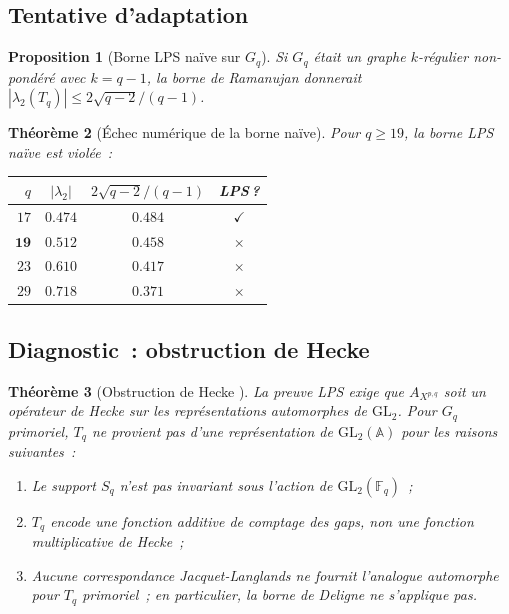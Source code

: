 \documentclass[11pt,a4paper]{article}
\newtheorem{theorem}{Théorème}[section]
\newtheorem{proposition}[theorem]{Proposition}
\theoremstyle{definition}
\newcommand{\F}{\mathbb{F}}
\newcommand{\bbA}{\mathbb{A}}
\newcommand{\GL}{\mathrm{GL}}
\begin{document}
\subsection{Tentative d'adaptation}

\begin{proposition}[Borne LPS naïve sur $G_q$]
\label{prop:lps_naive}
Si $G_q$ était un graphe $k$-régulier non-pondéré avec $k = q-1$,
la borne de Ramanujan donnerait $|\lambda_2(T_q)| \leq 2\sqrt{q-2}/(q-1)$.
\end{proposition}

\begin{theorem}[Échec numérique de la borne naïve]
\label{thm:lps_failure}
Pour $q\geq 19$, la borne LPS naïve est \emph{violée}~:
\begin{center}
\renewcommand{\arraystretch}{1.2}
\begin{tabular}{rccc}
\toprule
$q$ & $|\lambda_2|$ & $2\sqrt{q-2}/(q-1)$ & LPS\,? \\
\midrule
$17$ & $0.474$ & $0.484$ & $\checkmark$ \\
$\mathbf{19}$ & $\mathbf{0.512}$ & $\mathbf{0.458}$ &
$\boldsymbol{\times}$ \\
$23$ & $0.610$ & $0.417$ & $\boldsymbol{\times}$ \\
$29$ & $0.718$ & $0.371$ & $\boldsymbol{\times}$ \\
\bottomrule
\end{tabular}
\end{center}
\end{theorem}

\subsection{Diagnostic~: obstruction de Hecke}

\begin{theorem}[Obstruction de Hecke {\upshape [DIAG]}]
\label{thm:hecke_obstruction}
La preuve LPS exige que $A_{X^{p,q}}$ soit un \emph{opérateur de
Hecke} sur les représentations automorphes de $\GL_2$. Pour $G_q$
primoriel, $T_q$ \emph{ne provient pas} d'une représentation de
$\GL_2(\bbA)$ pour les raisons suivantes~:
\begin{enumerate}
  \item Le support $S_q$ n'est pas invariant sous l'action de
        $\GL_2(\F_q)$~;
  \item $T_q$ encode une fonction \emph{additive} de comptage des
        gaps, non une fonction \emph{multiplicative} de Hecke~;
  \item Aucune correspondance Jacquet-Langlands ne fournit l'analogue
        automorphe pour $T_q$ primoriel~; en particulier, la borne
        de Deligne ne s'applique pas.
\end{enumerate}
\end{theorem}
\end{document}
